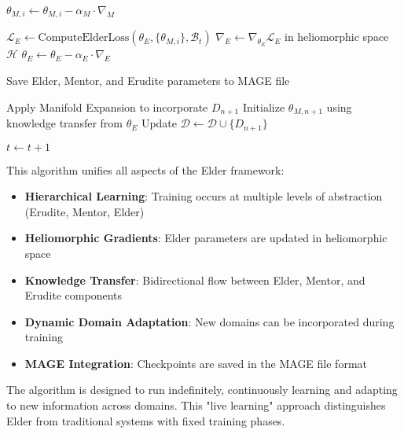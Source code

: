 \begin{algorithm}
\begin{algorithmic}[1]
        \State $\theta_{M,i} \gets \theta_{M,i} - \alpha_M \cdot \nabla_M$
    \EndFor
    
    \State $\mathcal{L}_E \gets \text{ComputeElderLoss}(\theta_E, \{\theta_{M,i}\}, \mathcal{B}_t)$
    \State $\nabla_E \gets \nabla_{\theta_E}\mathcal{L}_E$ in heliomorphic space $\mathcal{H}$
    \State $\theta_E \gets \theta_E - \alpha_E \cdot \nabla_E$ 
    
        \State Save Elder, Mentor, and Erudite parameters to MAGE file
    \EndIf
    
        \State Apply Manifold Expansion to incorporate $D_{n+1}$
        \State Initialize $\theta_{M,n+1}$ using knowledge transfer from $\theta_E$
        \State Update $\mathcal{D} \gets \mathcal{D} \cup \{D_{n+1}\}$
    \EndIf
    
    \State $t \gets t + 1$
\EndWhile
\end{algorithmic}
\end{algorithm}

This algorithm unifies all aspects of the Elder framework:

\begin{itemize}
    \item \textbf{Hierarchical Learning}: Training occurs at multiple levels of abstraction (Erudite, Mentor, Elder)
    \item \textbf{Heliomorphic Gradients}: Elder parameters are updated in heliomorphic space
    \item \textbf{Knowledge Transfer}: Bidirectional flow between Elder, Mentor, and Erudite components
    \item \textbf{Dynamic Domain Adaptation}: New domains can be incorporated during training
    \item \textbf{MAGE Integration}: Checkpoints are saved in the MAGE file format
\end{itemize}

The algorithm is designed to run indefinitely, continuously learning and adapting to new information across domains. This "live learning" approach distinguishes Elder from traditional systems with fixed training phases.